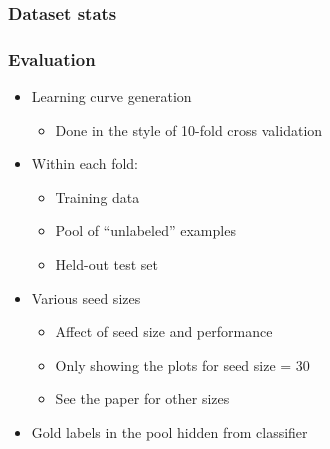 \documentclass{beamer}
\begin{document}
\begin{frame}
\frametitle{Dataset stats}
\end{frame}

\begin{frame}
\frametitle{Evaluation}
\begin{itemize}
\item Learning curve generation
\begin{itemize}
\item Done in the style of 10-fold cross validation
\end{itemize}
\item Within each fold: 
\begin{itemize}
\item Training data
\item Pool of ``unlabeled'' examples
\item Held-out test set
\end{itemize}
\item Various seed sizes
\begin{itemize}
\item Affect of seed size and performance
\item Only showing the plots for seed size = 30
\item See the paper for other sizes
\end{itemize}
\item Gold labels in the pool hidden from classifier
\end{itemize}
\end{frame}
\end{document}
